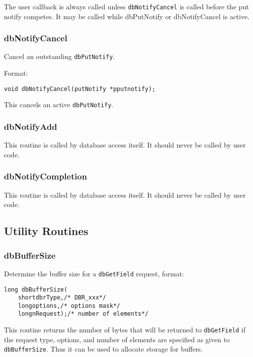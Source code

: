 The user callback is always called unless \verb|dbNotifyCancel| is called before the put notify competes. It may be called 
while dbPutNotify or dbNotifyCancel is active.

\subsubsection{dbNotifyCancel}

Cancel an outstanding \verb|dbPutNotify|.

Format:

\begin{verbatim}
void dbNotifyCancel(putNotify *pputnotify);
\end{verbatim}

This cancels an active \verb|dbPutNotify|.

\subsubsection{dbNotifyAdd}

This routine is called by database access itself. It should never be called by user code.

\subsubsection{dbNotifyCompletion}

This routine is called by database access itself. It should never be called by user code.

\subsection{Utility Routines}

\subsubsection{dbBufferSize}

Determine the buffer size for a \verb|dbGetField| request, format:

\begin{verbatim}
long dbBufferSize(
    shortdbrType,/* DBR_xxx*/
    longoptions,/* options mask*/
    longnRequest);/* number of elements*/
\end{verbatim}

This routine returns the number of bytes that will be returned to \verb|dbGetField| if the request type, options, and number of 
elements are specified as given to \verb|dbBufferSize|. Thus it can be used to allocate storage for buffers.

